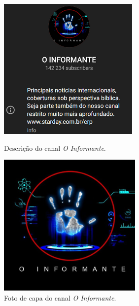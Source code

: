 \documentclass[portuguese]{textolivre}
\begin{document}
\begin{figure}[h!]
    \centering
    \begin{minipage}{0.45\textwidth}
        \centering
        \includegraphics[width=\linewidth]{Imagens/Fig1.png}
        \caption{Descrição do canal \emph{O Informante}.}
        \label{fig-1}
    \end{minipage}
    \hfill
    \begin{minipage}{0.45\textwidth}
        \centering
        \includegraphics[width=\linewidth]{Imagens/Fig2.png}
        \caption{Foto de capa do canal \emph{O Informante}.}
        \label{fig-2}
    \end{minipage}
\end{figure}
\end{document}

